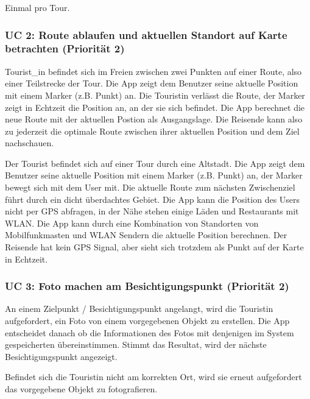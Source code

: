 \label{auftrittshuxe4ufigkeit}
Einmal pro Tour.


\subsubsection{UC 2: Route ablaufen und aktuellen Standort auf Karte betrachten (Priorität 2)}\label{uc-2-user-luxe4uft-route-ab-und-sieht-seine-aktuellen-standort-auf-einer-karte-priorituxe4t-2}
\label{erfolgszenario}
Tourist\_in befindet sich im Freien zwischen zwei Punkten auf einer
Route, also einer Teilstrecke der Tour. Die App zeigt dem Benutzer seine
aktuelle Position mit einem Marker (z.B. Punkt) an. Die Touristin verlässt
die Route, der Marker zeigt in Echtzeit die Position an, an der sie sich
befindet. Die App berechnet die neue Route mit der aktuellen Postion als
Ausgangslage. Die Reisende kann also zu jederzeit die optimale Route
zwischen ihrer aktuellen Position und dem Ziel nachschauen.


\label{erfolgszenario-mit-fallback}
Der Tourist befindet sich auf einer Tour durch eine Altstadt. Die App
zeigt dem Benutzer seine aktuelle Position mit einem Marker (z.B. Punkt)
an, der Marker bewegt sich mit dem User mit. Die aktuelle Route zum
nächsten Zwischenziel führt durch ein dicht überdachtes Gebiet. Die App
kann die Position des Users nicht per GPS abfragen, in der Nähe stehen
einige Läden und Restaurants mit WLAN. Die App kann durch eine
Kombination von Standorten von Mobilfunkmasten und WLAN Sendern die
aktuelle Position berechnen. Der Reisende hat kein GPS Signal, aber
sieht sich trotzdem als Punkt auf der Karte in Echtzeit.


\subsubsection{UC 3: Foto machen am Besichtigungspunkt (Priorität 2)}\label{uc-3-user-macht-foto-am-besichtigungspunkt-priorituxe4t-2}
\label{erfolgszenario-1}
An einem Zielpunkt / Besichtigungspunkt angelangt, wird die Touristin aufgefordert, ein Foto von einem vorgegebenen Objekt zu erstellen. Die
App entscheidet danach ob die Informationen des Fotos mit denjenigen im
System gespeicherten übereinstimmen. Stimmt das Resultat, wird der
nächste Besichtigungspunkt angezeigt.


\label{alternativszenario}
Befindet sich die Touristin nicht am korrekten Ort, wird sie erneut
aufgefordert das vorgegebene Objekt zu fotografieren.


